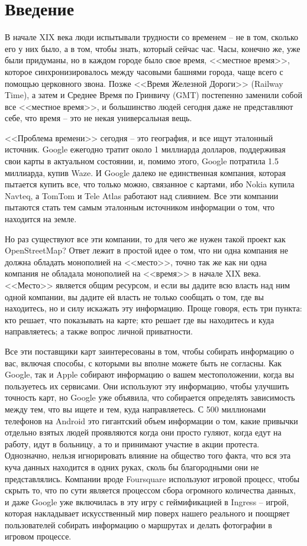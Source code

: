 \section{Введение}
В начале XIX века люди испытывали трудности со временем -- не в том, сколько 
его у них было, а в том, чтобы знать, который сейчас час. Часы, конечно же, 
уже были придуманы, но в каждом городе было свое время, <<местное время>>, 
которое синхронизировалось между часовыми башнями города, чаще всего с 
помощью церковного звона. Позже <<Время Железной Дороги>> (Railway Time), а 
затем и Среднее Время по Гринвичу (GMT) постепенно заменили собой все 
<<местное время>>, и большинство людей сегодня даже не представляют себе, что 
время -- это не некая универсальная вещь.

<<Проблема времени>> сегодня -- это география, и все ищут эталонный источник. 
Google ежегодно тратит около 1 миллиарда долларов, поддерживая свои карты в 
актуальном состоянии, и, помимо этого, Google потратила 1.5 миллиарда,
купив Waze\cite{waze}. И Google далеко не единственная компания,
которая пытается купить все, что только можно, связанное с картами, ибо 
Nokia купила Navteq\cite{navteq}, а TomTom\cite{tomtom} и 
Tele Atlas\cite{teleatlas} работают над слиянием. Все эти компании пытаются 
стать тем самым эталонным источником информации о том, что находится на земле.

Но раз существуют все эти компании, то для чего же нужен такой проект как 
OpenStreetMap? Ответ лежит в простой идее о том, что ни одна компания не 
должна обладать монополией на <<место>>, точно так же как ни одна компания не 
обладала монополией на <<время>> в начале XIX века. <<Место>> является общим 
ресурсом, и если вы дадите всю власть над ним одной компании, вы дадите ей 
власть не только сообщать о том, где вы находитесь, но и силу искажать эту 
информацию. Проще говоря, есть три пункта: кто решает, что показывать на 
карте; кто решает где вы находитесь и куда направляетесь; а также вопрос 
личной приватности.

Все эти поставщики карт заинтересованы в том, чтобы собирать информацию о вас, 
включая способы, с которыми вы вполне можете быть не согласны. Как Google, так 
и Apple собирают информацию о вашем местоположении, когда вы пользуетесь их 
сервисами. Они используют эту информацию, чтобы улучшить точность карт, но 
Google уже объявила, что собирается определять зависимость между тем, что вы 
ищете и тем, куда направляетесь. С 500 миллионами телефонов на Android это 
гигантский объем информации о том, какие привычки отдельно взятых людей 
проявляются когда они просто гуляют, когда едут на работу, идут в больницу, а 
то и принимают участие в акции протеста. Однозначно, нельзя игнорировать 
влияние на общество того факта, что вся эта куча данных находится в одних 
руках, сколь бы благородными они не представлялись. Компании вроде 
Foursquare\cite{four4} используют игровой процесс, чтобы скрыть то, что по 
сути является процессом сбора огромного количества данных, и даже Google уже 
включилась в эту игру с геймификацией в Ingress\cite{ingress} -- игрой, 
которая накладывает искусственный мир поверх нашего реального и поощряет 
пользователей собирать информацию о маршрутах и делать фотографии в
игровом процессе.

